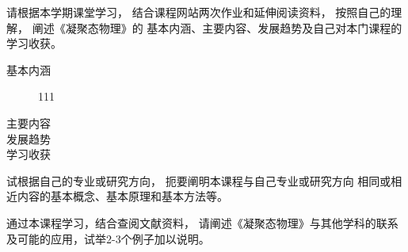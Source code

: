 \documentclass{article}
\begin{document}
\pagestyle{fancy}
\lhead{}
\rhead{}

\noindent
请根据本学期课堂学习，
结合课程网站两次作业和延伸阅读资料，
按照自己的理解，
阐述《凝聚态物理》的
基本内涵、主要内容、发展趋势及自己对本门课程的学习收获。

\begin{description}
    \item[基本内涵]111
    \item[主要内容] 
    \item[发展趋势]
    \item[学习收获]  
\end{description}

\noindent
试根据自己的专业或研究方向，
扼要阐明本课程与自己专业或研究方向
相同或相近内容的基本概念、基本原理和基本方法等。

\noindent
通过本课程学习，结合查阅文献资料，
请阐述《凝聚态物理》与其他学科的联系
及可能的应用，试举2-3个例子加以说明。
\end{document}
